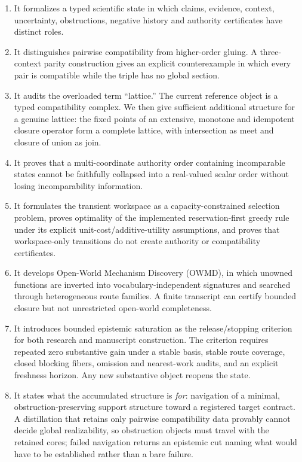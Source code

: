 \begin{enumerate}[leftmargin=*]
\item It formalizes a typed scientific state in which claims, evidence, context, uncertainty, obstructions, negative history and authority certificates have distinct roles.
\item It distinguishes pairwise compatibility from higher-order gluing. A three-context parity construction gives an explicit counterexample in which every pair is compatible while the triple has no global section.
\item It audits the overloaded term ``lattice.'' The current reference object is a typed compatibility complex. We then give sufficient additional structure for a genuine lattice: the fixed points of an extensive, monotone and idempotent closure operator form a complete lattice, with intersection as meet and closure of union as join.
\item It proves that a multi-coordinate authority order containing incomparable states cannot be faithfully collapsed into a real-valued scalar order without losing incomparability information.
\item It formulates the transient workspace as a capacity-constrained selection problem, proves optimality of the implemented reservation-first greedy rule under its explicit unit-cost/additive-utility assumptions, and proves that workspace-only transitions do not create authority or compatibility certificates.
\item It develops Open-World Mechanism Discovery (OWMD), in which unowned functions are inverted into vocabulary-independent signatures and searched through heterogeneous route families. A finite transcript can certify bounded closure but not unrestricted open-world completeness.
\item It introduces bounded epistemic saturation as the release/stopping criterion for both research and manuscript construction. The criterion requires repeated zero substantive gain under a stable basis, stable route coverage, closed blocking fibers, omission and nearest-work audits, and an explicit freshness horizon. Any new substantive object reopens the state.
\item It states what the accumulated structure is \emph{for}: navigation of a minimal, obstruction-preserving support structure toward a registered target contract. A distillation that retains only pairwise compatibility data provably cannot decide global realizability, so obstruction objects must travel with the retained cores; failed navigation returns an epistemic cut naming what would have to be established rather than a bare failure.
\end{enumerate}

